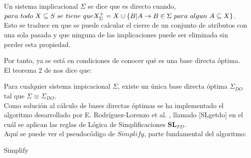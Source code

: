 Un sistema implicacional \( \Sigma \) se dice que es directo cuando, \( para \ todo \ X \subseteq S \ se \ tiene \ que \\ X^+_{\Sigma} =  X \cup \{ B | A \to B \in \Sigma \ para \ algun \ A \subseteq X \} \). Esto se traduce en que se puede calcular el cierre de un conjunto de atributos con una sola pasada y que ninguna de las implicaciones puede ser eliminada sin perder esta propiedad.

Por tanto, ya se est\'a en condiciones de conocer qu\'e es una base directa \'optima.\\

El teorema 2 de \cite{DO2} nos dice que:

Para cualquier sistema impicacional \(\Sigma\), existe un \'unica base directa \'optima \(\Sigma_{DO}\) tal que \(\Sigma \equiv \Sigma_{DO} \).\\

Como soluci\'on al c\'alculo de bases directas \'optimas se ha implementado el algoritmo desarrollado por  E. Rodr\'iguez-Lorenzo et al. \cite{DO2}, llamado [SLgetdo] en el cu\'al se aplican las reglas de L\'ogica de Simplificaciones \(\textbf{SL}_{FD}\).\\
\newpage
Aqu\'i se puede ver el pseudoc\'odigo de \(Simplify\), parte fundamental del algoritmo:

\IncMargin{1em}
\begin{algorithm}[H]
    \SetAlgoLined
    \DontPrintSemicolon
    \caption{Simplify}\label{alg:4}
\end{algorithm}\DecMargin{1em}

